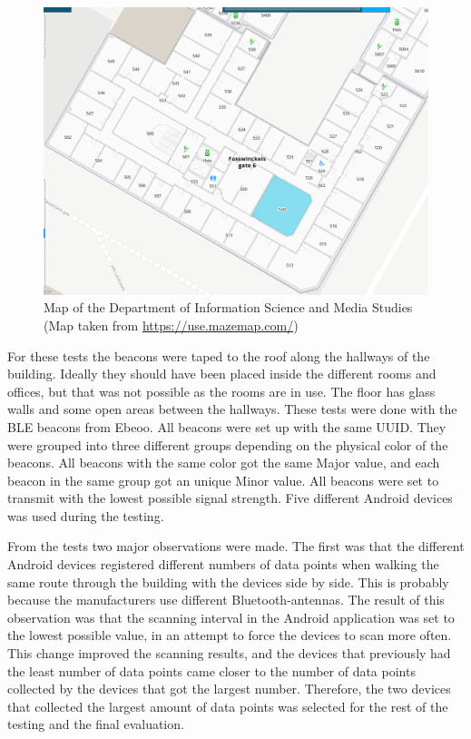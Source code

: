 \documentclass[../Main/thesis.tex]{subfiles}
\begin{document}
\begin{figure}[H]
	\centering
	\includegraphics[width=\textwidth]{../fig/infomedia-map}
	\caption[Map of the Department of Information Science and Media Studies]{Map of the Department of Information Science and Media Studies \small(Map taken from \url{https://use.mazemap.com/})}
	\label{fig:infomedia-map}
\end{figure}

For these tests the beacons were taped to the roof along the hallways of the building.
Ideally they should have been placed inside the different rooms and offices, but that was not possible as the rooms are in use.
The floor has glass walls and some open areas between the hallways.
These tests were done with the BLE beacons from Ebeoo.
All beacons were set up with the same UUID. 
They were grouped into three different groups depending on the physical color of the beacons.
All beacons with the same color got the same Major value, and each beacon in the same group got an unique Minor value.
All beacons were set to transmit with the lowest possible signal strength.
Five different Android devices was used during the testing.

From the tests two major observations were made.
The first was that the different Android devices registered different numbers of data points when walking the same route through the building with the devices side by side.
This is probably because the manufacturers use different Bluetooth-antennas. 
The result of this observation was that the scanning interval in the Android application was set to the lowest possible value, in an attempt to force the devices to scan more often.
This change improved the scanning results, and the devices that previously had the least number of data points came closer to the number of data points collected by the devices that got the largest number.
Therefore, the two devices that collected the largest amount of data points was selected for the rest of the testing and the final evaluation.
\end{document}
